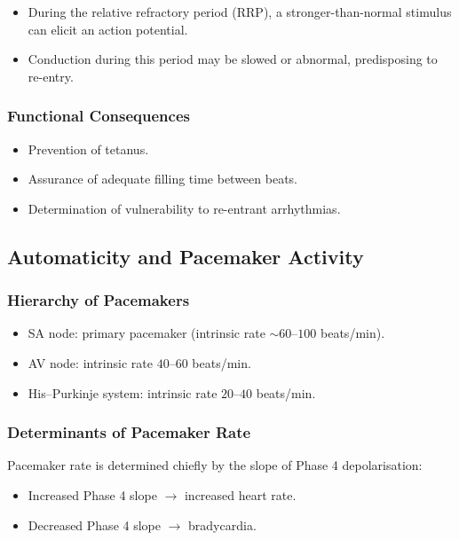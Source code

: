 \documentclass[11pt,a4paper]{article}
\begin{document}
\begin{itemize}
  \item During the relative refractory period (RRP), a stronger-than-normal stimulus can elicit an action potential.
  \item Conduction during this period may be slowed or abnormal, predisposing to re-entry.
\end{itemize}

\subsubsection{Functional Consequences}

\begin{itemize}
  \item Prevention of tetanus.
  \item Assurance of adequate filling time between beats.
  \item Determination of vulnerability to re-entrant arrhythmias.
\end{itemize}

\subsection{Automaticity and Pacemaker Activity}

\subsubsection{Hierarchy of Pacemakers}

\begin{itemize}
  \item SA node: primary pacemaker (intrinsic rate $\sim 60$--$100$ beats/min).
  \item AV node: intrinsic rate $40$--$60$ beats/min.
  \item His--Purkinje system: intrinsic rate $20$--$40$ beats/min.
\end{itemize}

\subsubsection{Determinants of Pacemaker Rate}

Pacemaker rate is determined chiefly by the slope of Phase 4 depolarisation:
\begin{itemize}
  \item Increased Phase 4 slope $\rightarrow$ increased heart rate.
  \item Decreased Phase 4 slope $\rightarrow$ bradycardia.
\end{itemize}
\end{document}
